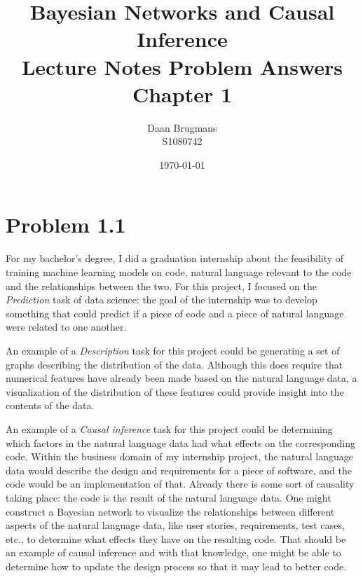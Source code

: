 \documentclass[a4paper]{article}
\title{Bayesian Networks and Causal Inference \\ Lecture Notes Problem Answers \\ Chapter 1}
\author{Daan Brugmans \\ S1080742}
\date{\today}
\begin{document}
\maketitle

\section*{Problem 1.1}
For my bachelor's degree, I did a graduation internship about the feasibility of training machine learning models on code, natural language relevant to the code and the relationships between the two.
For this project, I focused on the \textit{Prediction} task of data science: 
the goal of the internship was to develop something that could predict if a piece of code and a piece of natural language were related to one another.

An example of a \textit{Description} task for this project could be generating a set of graphs describing the distribution of the data. 
Although this does require that numerical features have already been made based on the natural language data, 
a visualization of the distribution of these features could provide insight into the contents of the data.

An example of a \textit{Causal inference} task for this project could be determining which factors in the natural language data had what effects on the corresponding code. 
Within the business domain of my internship project, 
the natural language data would describe the design and requirements for a piece of software, 
and the code would be an implementation of that. 
Already there is some sort of causality taking place: the code is the result of the natural language data. 
One might construct a Bayesian network to visualize the relationships between different aspects of the natural language data, 
like user stories, requirements, test cases, etc., 
to determine what effects they have on the resulting code. 
That should be an example of causal inference and with that knowledge, one might be able to determine how to update the design process so that it may lead to better code.
\end{document}
